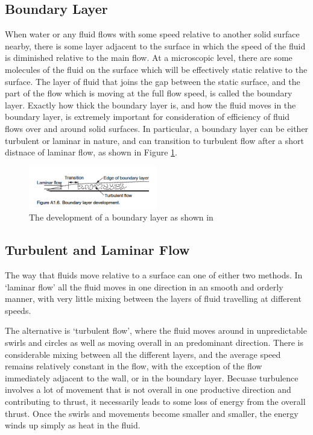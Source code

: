 \documentclass{article}\usepackage[]{graphicx}\usepackage[]{color}
\begin{document}
\begin{appendices}
\subsection{Boundary Layer}
When water or any fluid flows with some speed relative to another solid surface nearby, there is some layer adjacent to the surface in which the speed of the fluid is diminished relative to the main flow.  At a microscopic level, there are some molecules of the fluid on the surface which will be effectively static relative to the surface.  The layer of fluid that joins the gap between the static surface, and the part of the flow which is moving at the full flow speed, is called the boundary layer.  Exactly how thick the boundary layer is, and how the fluid moves in the boundary layer, is extremely important for consideration of efficiency of fluid flows over and around solid surfaces.  In particular, a boundary layer can be either turbulent or laminar in nature, and can transition to turbulent flow after a short distnace of laminar flow, as shown in Figure \ref{fig:BoundaryLayer.png}.


\begin{figure}[h]
\captionsetup{width=0.5\textwidth}
\includegraphics[width=0.5\textwidth, center]{BoundaryLayer.png}
\caption{The development of a boundary layer as shown in \parencite{mollard2011}}
\label{fig:BoundaryLayer.png}
\end{figure}

\subsection{Turbulent and Laminar Flow}
The way that fluids move relative to a surface can one of either two methods.  In `laminar flow' all the fluid moves in one direction in an smooth and orderly manner, with very little mixing between the layers of fluid travelling at different speeds.

The alternative is `turbulent flow', where the fluid moves around in unpredictable swirls and circles as well as moving overall in an predominant direction.  There is considerable mixing between all the different layers, and the average speed remains relatively constant in the flow, with the exception of the flow immediately adjacent to the wall, or in the boundary layer.  Becuase turbulence involves a lot of movement that is not overall in one productive direction and contributing to thrust, it necessarily leads to some loss of energy from the overall thrust.  Once the swirls and movements become smaller and smaller, the energy winds up simply as heat in the fluid.


\end{appendices}
\end{document}
